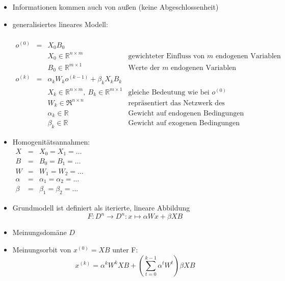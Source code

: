 \begin{itemize}
\setlength{\itemsep}{0pt}
	\item Informationen kommen auch von außen (keine Abgeschlossenheit)
	\item generalisiertes lineares Modell:\\\vspace*{-0.5\baselineskip}\\
		$\begin{array}{rcll}
			o^{(0)}&=& X_0B_0 &\\
			&&X_0\in\mathbb{R}^{n\times m}&\text{gewichteter Einfluss von }m\text{ endogenen Variablen}\\
			&& B_0\in\mathbb{R}^{m\times 1}&\text{Werte der }m\text{ endogenen Variablen}\\
			o^{(k)}&=&\alpha_kW_ko^{(k-1)}+\beta_kX_kB_k&\\
			&&X_k\in\mathbb{R}^{n\times m},~B_k\in\mathbb{R}^{m\times 1}&\text{gleiche Bedeutung wie bei }o^{(0)}\\
			&&W_k\in\Re^{n\times n}&\text{repräsentiert das Netzwerk des Einflusses (stochstisch)}\\
			&&\alpha_k\in\mathbb{R}&\text{Gewicht auf endogenen Bedingungen}\\
			&&\beta_k\in\mathbb{R}&\text{Gewicht auf exogenen Bedingungen}
		\end{array}$
	\item Homogenitätsannahmen:\\
		$\begin{array}{rcl}
			X&=&X_0=X_1=\dots\\
			B&=&B_0=B_1=\dots\\
			W&=& W_1=W_2=\dots\\
			\alpha&=&\alpha_1=\alpha_2=\dots\\
			\beta&=&\beta_1=\beta_2=\dots
		\end{array}$
	\item Grundmodell ist definiert als iterierte, lineare Abbildung
		\[F:D^n\rightarrow D^n: x\mapsto \alpha Wx+\beta XB\]
	\item Meinungsdomäne $D$
	\item Meinungsorbit von $x^{(0)}=XB$ unter F:
		\[x^{(k)}=\alpha^kW^kXB+\left(\sum\limits_{t=0}^{k-1}\alpha^tW^t\right)\beta XB\]
\end{itemize}
\topbreak
\vspace*{-\baselineskip}
